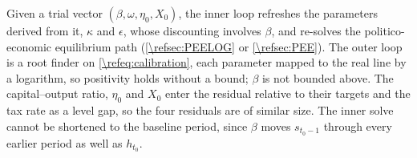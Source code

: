 Given a trial vector $\left(\beta, \omega, \eta_0, X_0\right)$, the inner loop refreshes the parameters derived from it, $\kappa$ and $\epsilon$, whose discounting involves $\beta$, and re-solves the politico-economic equilibrium path (\cref{\refsec:PEELOG} or \cref{\refsec:PEE}). The outer loop is a root finder on \eqref{\refeq:calibration}, each parameter mapped to the real line by a logarithm, so positivity holds without a bound; $\beta$ is not bounded above. The capital--output ratio, $\eta_0$ and $X_0$ enter the residual relative to their targets and the tax rate as a level gap, so the four residuals are of similar size. The inner solve cannot be shortened to the baseline period, since $\beta$ moves $s_{t_0-1}$ through every earlier period as well as $h_{t_0}$.
